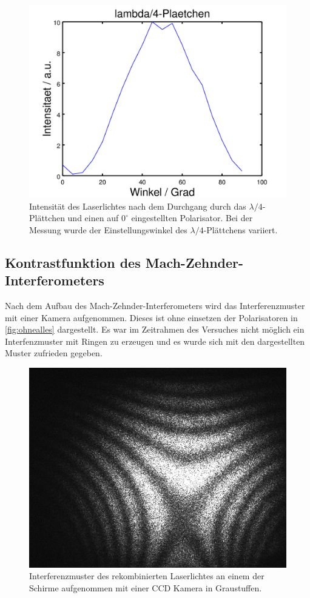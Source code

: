 \documentclass[numbers=noenddot,a4paper,notitlepage,twoside,BCOR15mm]{scrartcl}
\begin{document}
	\begin{figure}[h]
		\centering
		\includegraphics[width=0.5\columnwidth]{pics/lambda4.png}
		\caption{Intensität des Laserlichtes nach dem Durchgang durch das $\lambda /4$-Plättchen und einen auf $0^\circ$ eingestellten Polarisator. Bei der Messung wurde der Einstellungswinkel des $\lambda /4$-Plättchens variiert.}
		\label{fig:lambda4}
	\end{figure}
	
	\subsection{Kontrastfunktion des Mach-Zehnder-Interferometers}	
	
	Nach dem Aufbau des Mach-Zehnder-Interferometers wird das Interferenzmuster mit einer Kamera aufgenommen. Dieses ist ohne einsetzen der Polarisatoren in \autoref{fig:ohnealles} dargestellt. Es war im Zeitrahmen des Versuches nicht möglich ein Interfenzmuster mit Ringen zu erzeugen und es wurde sich mit den dargestellten Muster zufrieden gegeben. 
	
	\begin{figure}[h]
		\centering
		\includegraphics[width = 0.5 \columnwidth]{pics/ohnealles.png}
		\caption{Interferenzmuster des rekombinierten Laserlichtes an einem der Schirme aufgenommen mit einer CCD Kamera in Graustuffen.}
		\label{fig:ohnealles}
	\end{figure}
	
\end{document}
